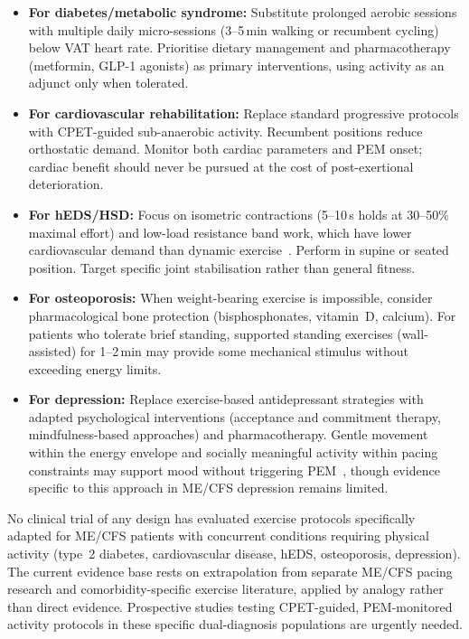 \begin{itemize}
    \item \textbf{For diabetes/metabolic syndrome:} Substitute prolonged
      aerobic sessions with multiple daily micro-sessions (3--5\,min walking
      or recumbent cycling) below VAT heart rate. Prioritise dietary
      management and pharmacotherapy (metformin, GLP-1 agonists) as primary
      interventions, using activity as an adjunct only when tolerated.

    \item \textbf{For cardiovascular rehabilitation:} Replace standard
      progressive protocols with CPET-guided sub-anaerobic activity.
      Recumbent positions reduce orthostatic demand. Monitor both cardiac
      parameters and PEM onset; cardiac benefit should never be pursued at
      the cost of post-exertional deterioration.

    \item \textbf{For hEDS/HSD:} Focus on isometric contractions (5--10\,s
      holds at 30--50\% maximal effort) and low-load resistance band work,
      which have lower cardiovascular demand than dynamic
      exercise~\cite{Zabriskie2022hEDSresistance}. Perform in supine or
      seated position. Target specific joint stabilisation rather than
      general fitness.

    \item \textbf{For osteoporosis:} When weight-bearing exercise is
      impossible, consider pharmacological bone protection
      (bisphosphonates, vitamin~D, calcium). For patients who tolerate brief
      standing, supported standing exercises (wall-assisted) for 1--2\,min
      may provide some mechanical stimulus without exceeding energy limits.

    \item \textbf{For depression:} Replace exercise-based antidepressant
      strategies with adapted psychological interventions (acceptance and
      commitment therapy, mindfulness-based approaches) and pharmacotherapy.
      Gentle movement within the energy envelope and socially meaningful
      activity within pacing constraints may support mood without triggering
      PEM~\cite{FrontiersDepCFS2025}, though evidence specific to this
      approach in ME/CFS depression remains limited.
\end{itemize}

\begin{open_question}
\label{oq:comorbidity-exercise}
No clinical trial of any design has evaluated exercise protocols specifically
adapted for ME/CFS patients with concurrent conditions requiring physical
activity (type~2 diabetes, cardiovascular disease, hEDS, osteoporosis,
depression). The current evidence base rests on extrapolation from separate
ME/CFS pacing research and comorbidity-specific exercise literature, applied
by analogy rather than direct evidence. Prospective studies testing
CPET-guided, PEM-monitored activity protocols in these specific dual-diagnosis
populations are urgently needed.
\end{open_question}

